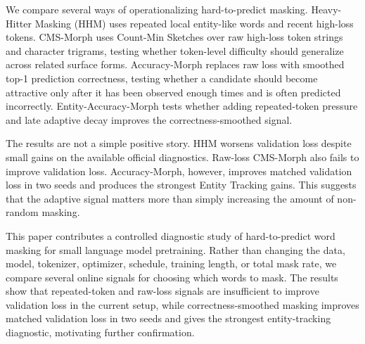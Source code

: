 We compare several ways of operationalizing hard-to-predict masking. Heavy-Hitter Masking (HHM) uses repeated local entity-like words and recent high-loss tokens. CMS-Morph uses Count-Min Sketches over raw high-loss token strings and character trigrams, testing whether token-level difficulty should generalize across related surface forms. Accuracy-Morph replaces raw loss with smoothed top-1 prediction correctness, testing whether a candidate should become attractive only after it has been observed enough times and is often predicted incorrectly. Entity-Accuracy-Morph tests whether adding repeated-token pressure and late adaptive decay improves the correctness-smoothed signal.

The results are not a simple positive story. HHM worsens validation loss despite small gains on the available official diagnostics. Raw-loss CMS-Morph also fails to improve validation loss. Accuracy-Morph, however, improves matched validation loss in two seeds and produces the strongest Entity Tracking gains. This suggests that the adaptive signal matters more than simply increasing the amount of non-random masking.

This paper contributes a controlled diagnostic study of hard-to-predict word masking for small language model pretraining. Rather than changing the data, model, tokenizer, optimizer, schedule, training length, or total mask rate, we compare several online signals for choosing which words to mask. The results show that repeated-token and raw-loss signals are insufficient to improve validation loss in the current setup, while correctness-smoothed masking improves matched validation loss in two seeds and gives the strongest entity-tracking diagnostic, motivating further confirmation.
